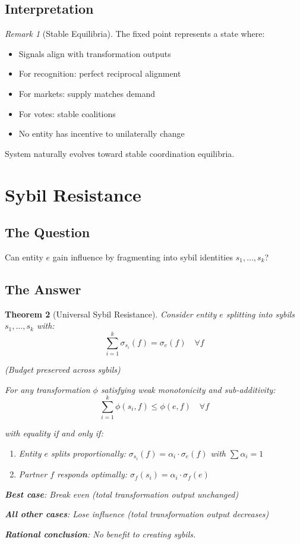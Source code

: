 \documentclass[11pt,a4paper]{article}
\newtheorem{theorem}{Theorem}[section]
\theoremstyle{definition}
\theoremstyle{remark}
\newtheorem{remark}[theorem]{Remark}
\begin{document}
\subsection{Interpretation}

\begin{remark}[Stable Equilibria]
The fixed point represents a state where:
\begin{itemize}
\item Signals align with transformation outputs
\item For recognition: perfect reciprocal alignment
\item For markets: supply matches demand
\item For votes: stable coalitions
\item No entity has incentive to unilaterally change
\end{itemize}

System naturally evolves toward stable coordination equilibria.
\end{remark}

\section{Sybil Resistance}

\subsection{The Question}

Can entity $e$ gain influence by fragmenting into sybil identities $s_1, \ldots, s_k$?

\subsection{The Answer}

\begin{theorem}[Universal Sybil Resistance]
\label{thm:sybil}
Consider entity $e$ splitting into sybils $s_1, \ldots, s_k$ with:
\[ \sum_{i=1}^k \sigma_{s_i}(f) = \sigma_e(f) \quad \forall f \]

(Budget preserved across sybils)

For any transformation $\phi$ satisfying weak monotonicity and sub-additivity:
\[ \sum_{i=1}^k \phi(s_i, f) \le \phi(e, f) \quad \forall f \]

with equality if and only if:
\begin{enumerate}
\item Entity $e$ splits proportionally: $\sigma_{s_i}(f) = \alpha_i \cdot \sigma_e(f)$ with $\sum \alpha_i = 1$
\item Partner $f$ responds optimally: $\sigma_f(s_i) = \alpha_i \cdot \sigma_f(e)$
\end{enumerate}

\textbf{Best case}: Break even (total transformation output unchanged)

\textbf{All other cases}: Lose influence (total transformation output decreases)

\textbf{Rational conclusion}: No benefit to creating sybils.
\end{theorem}
\end{document}
